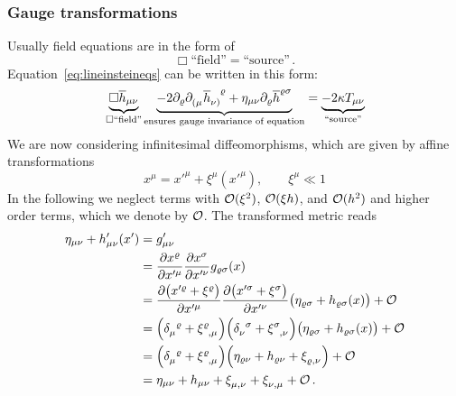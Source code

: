 \subsubsection{Gauge transformations}
Usually field equations are in the form of
\begin{equation}
    \Box \text{``field''} = \text{``source''}\,.
\end{equation}
Equation~\eqref{eq:lineinsteineqs} can be written in this form:
\begin{equation}
    \underbrace{\Box \overline{h}_{\mu\nu}}_{\Box\text{``field''}}
    \underbrace{- 2 \partial_\varrho \tensor{\partial}{_(_\mu} \tensor{\overline{h}}{_\nu_)^\varrho}
    + \eta_{\mu\nu}\partial_\varrho \overline{h}^{\varrho\sigma}}_{\text{ensures gauge invariance of equation}}
    = \underbrace{-2\kappa T_{\mu\nu}}_{\text{``source''}}
\end{equation}
We are now considering infinitesimal diffeomorphisms, which are given by affine
transformations
\begin{equation}
    x^\mu = x'^\mu + \xi^\mu(x'^\mu), \qquad \xi^\mu \ll 1
\end{equation}
In the following we neglect terms with $\mathcal{O}(\xi^2)$, $\mathcal{O}(\xi h)$, and
$\mathcal{O}(h^2)$ and higher order terms, which we denote by $\mathcal{O}$.
The transformed metric reads
\begin{equation}
    \begin{split}
        \eta_{\mu\nu} + h'_{\mu\nu}(x') &= g'_{\mu\nu} \\
        &= \frac{\partial x^\varrho}{\partial x'^\mu} \frac{\partial x^\sigma}{\partial x'^\nu} g_{\varrho\sigma}(x) \\
        &= \frac{\partial \left( x'^\varrho + \xi^\varrho \right)}{\partial x'^\mu}
        \frac{\partial \left( x'^\sigma + \xi^\sigma \right)}{\partial x'^\nu}
        \left( \eta_{\varrho\sigma} + h_{\varrho\sigma}(x) \right) + \landauO \\
        &= \left( \tensor{\delta}{_\mu^\varrho} + \tensor{\xi}{^\varrho_,_\mu} \right)
        \left( \tensor{\delta}{_\nu^\sigma} + \tensor{\xi}{^\sigma_,_\nu} \right)
        \left( \eta_{\varrho\sigma} + h_{\varrho\sigma}(x) \right) + \landauO \\
        &= \left( \tensor{\delta}{_\mu^\varrho} + \tensor{\xi}{^\varrho_,_\mu} \right)
        \left( \eta_{\varrho\nu} + h_{\varrho\nu} + \tensor{\xi}{_\varrho_,_\nu}
        \right) + \landauO \\
        &= \eta_{\mu\nu} + h_{\mu\nu} + \tensor{\xi}{_\mu_,_\nu} +
        \tensor{\xi}{_\nu_,_\mu} + \landauO\,.
    \end{split}
\end{equation}
